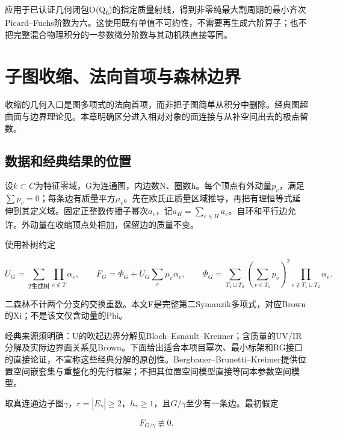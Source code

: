 \documentclass[11pt,a4paper,oneside]{ctexrep}
\theoremstyle{cnplain}
\theoremstyle{definition}
\theoremstyle{remark}
\begin{document}
应用于已认证几何闭包O(Q\textsubscript{6})的指定质量射线，得到非零纯最大割周期的最小齐次Picard--Fuchs阶数为六。这使用既有单值不可约性，不需要再生成六阶算子；也不把完整混合物理积分的一参数微分阶数与其动机秩直接等同。


\chapter{子图收缩、法向首项与森林边界}\label{ch:contraction}
收缩的几何入口是图多项式的法向首项，而非把子图简单从积分中删除。经典图超曲面与边界理论见\cite{bek,browncosmic,bbr}。本章明确区分进入相对对象的面连接与从补空间出去的极点留数。
\section{数据和经典结果的位置}\label{sec:contraction:1}

设\(k\subset C\)为特征零域，G为连通图，内边数N、圈数h。每个顶点有外动量\(p_v\)，满足\(\sum p_v=0\)；每条边有质量平方\(\mu _e\)。先在欧氏正质量区域推导，再把有理恒等式延伸到其定义域。固定正整数传播子幂次\(a_e\)，记\(a_H=\sum _{e\in H}a_e\)。自环和平行边允许。外动量在收缩顶点处相加，保留边的质量不变。

使用补树约定

\begin{equation}
U_G=\sum_{T\text{生成树}}\prod_{e\notin T}\alpha_e,\qquad
 F_G=\Phi_G+U_G\sum_e\mu_e\alpha_e,\qquad
 \Phi_G=\sum_{T_1\sqcup T_2}(\sum_{v\in T_1}p_v)^2
                                  \prod_{e\notin T_1\sqcup T_2}\alpha_e.       \label{eq:contraction:1}
\end{equation}

二森林不计两个分支的交换重数。本文F是完整第二Symanzik多项式，对应Brown的Xi；不是该文仅含动量的Phi。

经典来源须明确：U的吹起边界分解见Bloch--Esnault--Kreimer\cite[Proposition 3.5]{bek}；含质量的UV/IR分解及实际边界面关系见Brown\cite[Proposition 2.2, Theorems 2.7, 6.5, 7.8]{browncosmic}。下面给出适合本项目幂次、最小标架和RG接口的直接论证，不宣称这些经典分解的原创性。Bergbauer--Brunetti--Kreimer\cite{bbr}提供位置空间嵌套集与重整化的先行框架；不把其位置空间模型直接等同本参数空间模型。

取真连通边子图\(\gamma \)，\(r=|E_\gamma |\ge 2\)，\(h_\gamma \ge 1\)，且\(G/\gamma \)至少有一条边。最初假定

\begin{equation}
F_{G/\gamma}\not\equiv0.                  \label{eq:contraction:2}
\end{equation}
\end{document}
